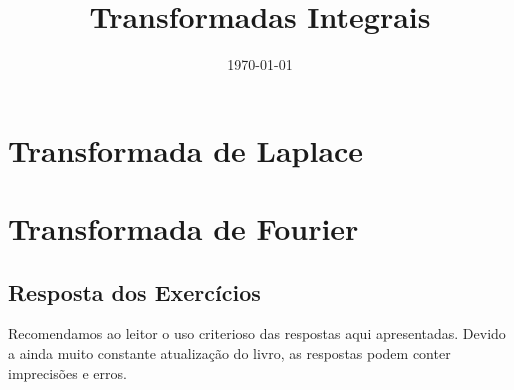 \documentclass[12pt]{book}
\begin{document}
\frontmatter
\title{Transformadas Integrais}
\date{\today}
\author{}
\maketitle










\tableofcontents


\mainmatter


\part{Transformada de Laplace}











\part{Transformada de Fourier}











%

\appendix




\chapter*{Resposta dos Exercícios}
Recomendamos ao leitor o uso criterioso das respostas aqui apresentadas. Devido a ainda muito constante atualização do livro, as respostas podem conter imprecisões e erros.
\shipoutAnswer  





\end{document}
